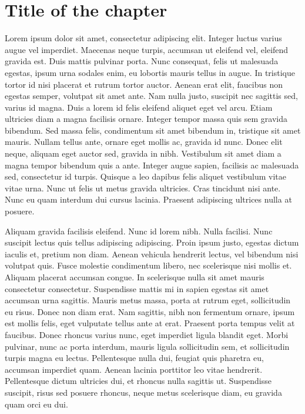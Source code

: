 \chapter[Capitulo 1]{\label{identificadorReferenciaCruzada}
Title of the chapter}

Lorem ipsum dolor sit amet, consectetur adipiscing elit. Integer luctus varius augue vel imperdiet. Maecenas neque turpis, accumsan ut eleifend vel, eleifend gravida est. Duis mattis pulvinar porta. Nunc consequat, felis ut malesuada egestas, ipsum urna sodales enim, eu lobortis mauris tellus in augue. In tristique tortor id nisi placerat et rutrum tortor auctor. Aenean erat elit, faucibus non egestas semper, volutpat sit amet ante. Nam nulla justo, suscipit nec sagittis sed, varius id magna. Duis a lorem id felis eleifend aliquet eget vel arcu. Etiam ultricies diam a magna facilisis ornare. Integer tempor massa quis sem gravida bibendum. Sed massa felis, condimentum sit amet bibendum in, tristique sit amet mauris. Nullam tellus ante, ornare eget mollis ac, gravida id nunc. Donec elit neque, aliquam eget auctor sed, gravida in nibh. Vestibulum sit amet diam a magna tempor bibendum quis a ante. Integer augue sapien, facilisis ac malesuada sed, consectetur id turpis. Quisque a leo dapibus felis aliquet vestibulum vitae vitae urna. Nunc ut felis ut metus gravida ultricies. Cras tincidunt nisi ante. Nunc eu quam interdum dui cursus lacinia. Praesent adipiscing ultrices nulla at posuere.

Aliquam gravida facilisis eleifend. Nunc id lorem nibh. Nulla facilisi. Nunc suscipit lectus quis tellus adipiscing adipiscing. Proin ipsum justo, egestas dictum iaculis et, pretium non diam. Aenean vehicula hendrerit lectus, vel bibendum nisi volutpat quis. Fusce molestie condimentum libero, nec scelerisque nisi mollis et. Aliquam placerat accumsan congue. In scelerisque nulla sit amet mauris consectetur consectetur. Suspendisse mattis mi in sapien egestas sit amet accumsan urna sagittis. Mauris metus massa, porta at rutrum eget, sollicitudin eu risus. Donec non diam erat. Nam sagittis, nibh non fermentum ornare, ipsum est mollis felis, eget vulputate tellus ante at erat. Praesent porta tempus velit at faucibus. Donec rhoncus varius nunc, eget imperdiet ligula blandit eget. Morbi pulvinar, nunc ac porta interdum, mauris ligula sollicitudin sem, et sollicitudin turpis magna eu lectus. Pellentesque nulla dui, feugiat quis pharetra eu, accumsan imperdiet quam. Aenean lacinia porttitor leo vitae hendrerit. Pellentesque dictum ultricies dui, et rhoncus nulla sagittis ut. Suspendisse suscipit, risus sed posuere rhoncus, neque metus scelerisque diam, eu gravida quam orci eu dui.

